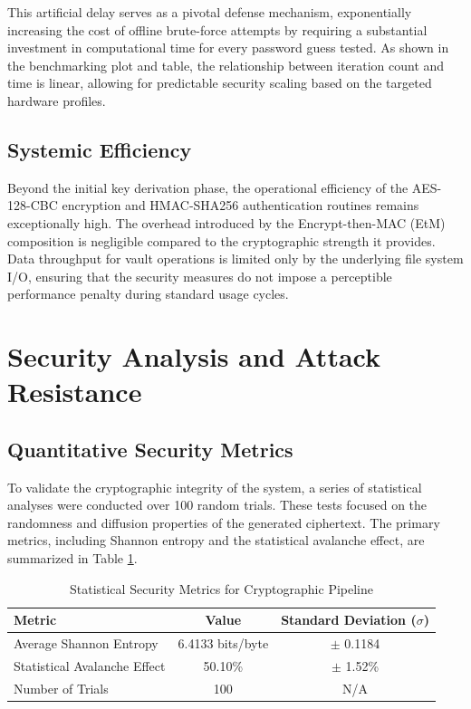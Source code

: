 This artificial delay serves as a pivotal defense mechanism, exponentially increasing the cost of offline brute-force attempts by requiring a substantial investment in computational time for every password guess tested. As shown in the benchmarking plot and table, the relationship between iteration count and time is linear, allowing for predictable security scaling based on the targeted hardware profiles.

\subsection{Systemic Efficiency}
Beyond the initial key derivation phase, the operational efficiency of the AES-128-CBC encryption and HMAC-SHA256 authentication routines remains exceptionally high. The overhead introduced by the Encrypt-then-MAC (EtM) composition is negligible compared to the cryptographic strength it provides. Data throughput for vault operations is limited only by the underlying file system I/O, ensuring that the security measures do not impose a perceptible performance penalty during standard usage cycles.

\section{Security Analysis and Attack Resistance}

\subsection{Quantitative Security Metrics}
To validate the cryptographic integrity of the system, a series of statistical analyses were conducted over 100 random trials. These tests focused on the randomness and diffusion properties of the generated ciphertext. The primary metrics, including Shannon entropy and the statistical avalanche effect, are summarized in Table \ref{tab:security_metrics}.

\begin{table}[H]
    \centering
    \caption{Statistical Security Metrics for Cryptographic Pipeline}
    \label{tab:security_metrics}
    \begin{tabular}{lcc}
        \hline
        \textbf{Metric} & \textbf{Value} & \textbf{Standard Deviation ($\sigma$)} \\ \hline
        Average Shannon Entropy & 6.4133 bits/byte & $\pm$ 0.1184 \\
        Statistical Avalanche Effect & 50.10\% & $\pm$ 1.52\% \\
        Number of Trials & 100 & N/A \\ \hline
    \end{tabular}
\end{table}

